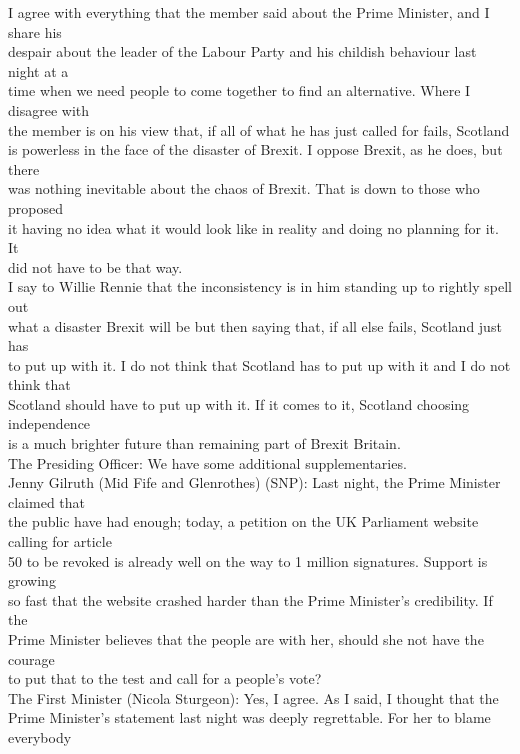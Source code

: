 \documentclass{article}
\begin{document}
\begin{description}
{I agree with everything that the member said about the Prime Minister, and I share his\\
despair about the leader of the Labour Party and his childish behaviour last night at a\\
time when we need people to come together to find an alternative. Where I disagree with\\
the member is on his view that, if all of what he has just called for fails, Scotland\\
is powerless in the face of the disaster of Brexit. I oppose Brexit, as he does, but there\\
was nothing inevitable about the chaos of Brexit. That is down to those who proposed\\
it having no idea what it would look like in reality and doing no planning for it. It\\
did not have to be that way.\\
I say to Willie Rennie that the inconsistency is in him standing up to rightly spell out\\
what a disaster Brexit will be but then saying that, if all else fails, Scotland just has\\
to put up with it. I do not think that Scotland has to put up with it and I do not think that\\
Scotland should have to put up with it. If it comes to it, Scotland choosing independence\\
is a much brighter future than remaining part of Brexit Britain.\\
The Presiding Officer: We have some additional supplementaries.\\
Jenny Gilruth (Mid Fife and Glenrothes) (SNP): Last night, the Prime Minister claimed that\\
the public have had enough; today, a petition on the UK Parliament website calling for article\\
50 to be revoked is already well on the way to 1 million signatures. Support is growing\\
so fast that the website crashed harder than the Prime Minister’s credibility. If the\\
Prime Minister believes that the people are with her, should she not have the courage\\
to put that to the test and call for a people’s vote?\\
The First Minister (Nicola Sturgeon): Yes, I agree. As I said, I thought that the\\
Prime Minister’s statement last night was deeply regrettable. For her to blame everybody\\
}
\end{description}
\end{document}
